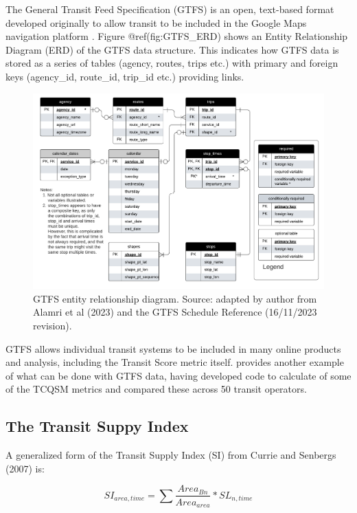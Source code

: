 \documentclass[preprint, 3p,
authoryear]{elsarticle} %
\begin{document}
The General Transit Feed Specification (GTFS) is an open, text-based
format developed originally to allow transit to be included in the
Google Maps navigation platform \citep{GTFS}. Figure @ref(fig:GTFS\_ERD)
shows an Entity Relationship Diagram (ERD) of the GTFS data structure.
This indicates how GTFS data is stored as a series of tables (agency,
routes, trips etc.) with primary and foreign keys (agency\_id,
route\_id, trip\_id etc.) providing links.

\begin{figure}
\includegraphics[width=1\linewidth]{graphics/GTFS} \caption{GTFS entity relationship diagram. Source: adapted by author from Alamri et al (2023) and the GTFS Schedule Reference (16/11/2023 revision).}\label{fig:GTFS_ERD}
\end{figure}

GTFS allows individual transit systems to be included in many online
products and analysis, including the Transit Score metric itself.
\citet{Wong:2013aa} provides another example of what can be done with
GTFS data, having developed code to calculate of some of the TCQSM
metrics and compared these across 50 transit operators.

\hypertarget{the-transit-suppy-index}{%
\subsection{The Transit Suppy Index}\label{the-transit-suppy-index}}

A generalized form of the Transit Supply Index (SI) from Currie and
Senbergs (2007) is:

\[SI_{area, time} = \sum{\frac{Area_{Bn}}{Area_{area}}*SL_{n, time}}\]
\end{document}
